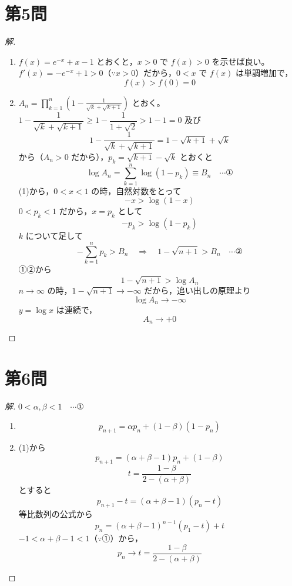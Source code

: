 \documentclass[../main.tex]{subfiles}
\begin{document}
\newpage

\section*{第5問}

\begin{proof}[解]
  \begin{enumerate}
    \item[(1)] $f(x)=e^{-x}+x-1$ とおくと，$x>0$ で $f(x)>0$ を示せば良い。
      $f'(x)=-e^{-x}+1>0$（$\because x>0$）だから，$0<x$ で $f(x)$ は単調増加で，
      \[
        f(x)>f(0)=0
      \]

    \item[(2)] $A_n = \displaystyle\prod_{k=1}^n\left(1-\frac{1}{\sqrt{k}+\sqrt{k+1}}\right)$ とおく。$1-\dfrac{1}{\sqrt{k}+\sqrt{k+1}} \ge 1-\dfrac{1}{1+\sqrt2} > 1-1 = 0$ 及び
      \[
        1-\frac{1}{\sqrt{k}+\sqrt{k+1}} = 1-\sqrt{k+1}+\sqrt{k}
      \]
      から（$A_n>0$ だから），$p_k=\sqrt{k+1}-\sqrt{k}$ とおくと
      \[
        \log A_n = \sum_{k=1}^n \log(1-p_k) \equiv B_n \quad \cdots \text{①}
      \]
      (1)から，$0<x<1$ の時，自然対数をとって
      \[
        -x > \log(1-x)
      \]
      $0<p_k<1$ だから，$x=p_k$ として
      \[
        -p_k > \log(1-p_k)
      \]
      $k$ について足して
      \[
        -\sum_{k=1}^n p_k > B_n \quad\Longrightarrow\quad 1-\sqrt{n+1} > B_n \quad \cdots \text{②}
      \]
      ①②から
      \[
        1-\sqrt{n+1} > \log A_n
      \]
      $n\to\infty$ の時，$1-\sqrt{n+1}\to-\infty$ だから，追い出しの原理より
      \[
        \log A_n \to -\infty
      \]
      $y=\log x$ は連続で，
      \[
        A_n \to +0
      \]
  \end{enumerate}
\end{proof}

\newpage

\section*{第6問}

\begin{proof}[解]
  $0<\alpha,\beta<1 \quad \cdots \text{①}$

  \begin{enumerate}
    \item[(1)]
      \[
        p_{n+1} = \alpha p_n + (1-\beta)(1-p_n)
      \]

    \item[(2)] (1)から
      \[
        p_{n+1} = (\alpha+\beta-1)p_n + (1-\beta)
      \]
      \[
        t = \frac{1-\beta}{2-(\alpha+\beta)}
      \]
      とすると
      \[
        p_{n+1}-t = (\alpha+\beta-1)(p_n-t)
      \]
      等比数列の公式から
      \[
        p_n = (\alpha+\beta-1)^{n-1}(p_1-t)+t
      \]
      $-1<\alpha+\beta-1<1$（$\because$①）から，
      \[
        p_n \to t = \frac{1-\beta}{2-(\alpha+\beta)}
      \]
  \end{enumerate}
\end{proof}
\end{document}
